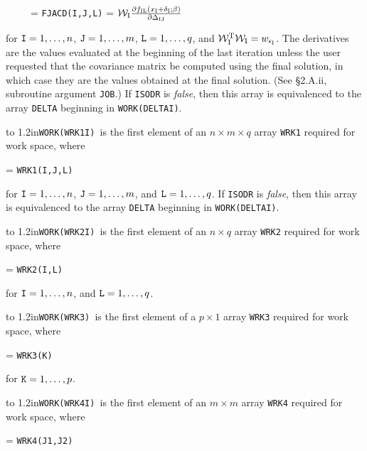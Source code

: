 
\aligntobox\ \ \ \ \ = {\tt FJACD(I,J,L)} = ${\cal W}_{\rm I}{{\partial
f_{\rm IL}(x_{\rm I}+\delta_{\rm I};\beta)}\over{\partial\Delta_{\rm
IJ}}}$

\aligntobox for ${\tt I} = 1,\ldots,n$, ${\tt J} = 1,\ldots,m$, ${\tt L} = 1,\ldots,q$, and ${\cal W}_{\rm I}^{\rm T}{\cal W}_{\rm I}=w_{\epsilon_{\rm
I}}$. The derivatives are the values evaluated at the beginning of the last iteration unless the user requested that the covariance matrix be computed using the final solution, in which case they are the values obtained at the final solution. (See \S 2.A.ii, subroutine argument {\tt JOB}.) If {\tt ISODR} is {\it false\/}, then this array is equivalenced to the array {\tt DELTA} beginning in {\tt WORK(DELTAI)}.
\bigskip

\hangindent\wd\mybox{}\noindent\hbox to
1.2in{\hfill\tt WORK(WRK1I) }is the first element of an $n \times m \times q$ array {\tt WRK1} required for work space, where

 = {\tt WRK1(I,J,L)}

\aligntobox for ${\tt I} = 1,\ldots,n$, ${\tt J} = 1,\ldots,m$, and ${\tt L} = 1,\ldots,q$. If {\tt ISODR} is {\it false\/}, then this array is equivalenced to the array {\tt DELTA} beginning in {\tt WORK(DELTAI)}.
\bigskip

\hangindent\wd\mybox{}\noindent\hbox to
1.2in{\hfill\tt WORK(WRK2I) }is the first element of an $n \times q$ array {\tt WRK2} required for work space, where

 = {\tt WRK2(I,L)}

\aligntobox for ${\tt I} = 1,\ldots,n$, and ${\tt L} = 1,\ldots,q$.
\bigskip

\hangindent\wd\mybox{}\noindent\hbox to
1.2in{\hfill\tt WORK(WRK3) }is the first element of a $p \times 1$ array {\tt WRK3} required for work space, where

 = {\tt WRK3(K)}

\aligntobox for ${\tt K} = 1,\ldots,p$.
\bigskip

\hangindent\wd\mybox{}\noindent\hbox to
1.2in{\hfill\tt WORK(WRK4I) }is the first element of an $m \times m$ array {\tt WRK4} required for work space, where

 = {\tt WRK4(J1,J2)} 

